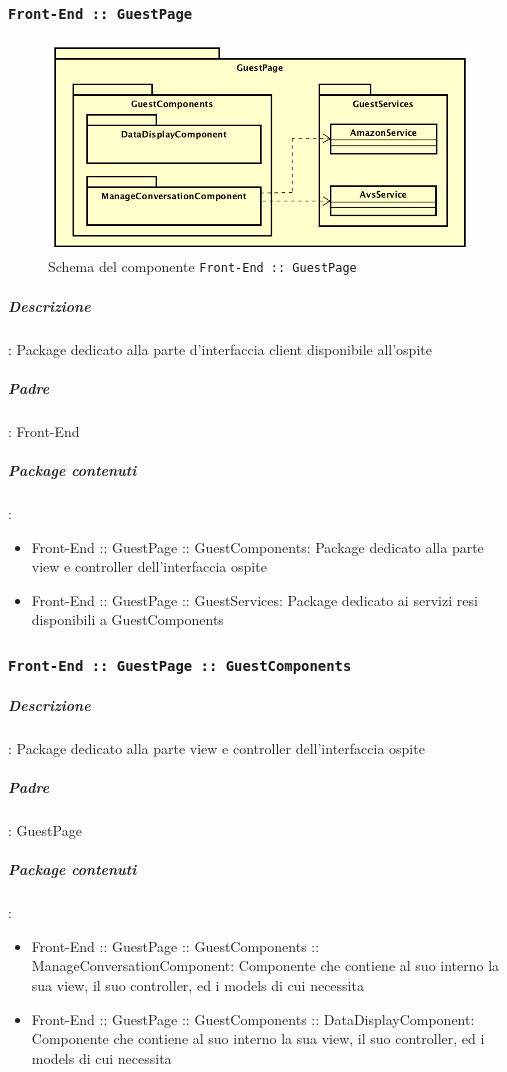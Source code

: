 \documentclass[../DefinizioneDiProdotto_v2.0.0.tex]{subfiles}
\begin{document}
	\newpage
	\subsubsection{\texttt{Front-End :: GuestPage}}
	\begin{figure}[!h]
		\centering
		\includegraphics[scale=0.6]{Architettura/Front-End/GuestPage/GuestPage.png}
		\caption{Schema del componente \texttt{Front-End :: GuestPage}}
	\end{figure}

			\subparagraph{Descrizione}: Package dedicato alla parte d'interfaccia client disponibile all'ospite
			\subparagraph{Padre}: Front-End
			\subparagraph{Package contenuti}:
			\begin{itemize}
				\item Front-End :: GuestPage :: GuestComponents: Package dedicato alla parte view e controller dell'interfaccia ospite
				\item Front-End :: GuestPage :: GuestServices: Package dedicato ai servizi resi disponibili a GuestComponents
			\end{itemize}


	\newpage
	\subsubsection{\texttt{Front-End :: GuestPage :: GuestComponents}}

			\subparagraph{Descrizione}: Package dedicato alla parte view e controller dell'interfaccia ospite
			\subparagraph{Padre}: GuestPage
			\subparagraph{Package contenuti}:
			\begin{itemize}
				\item Front-End :: GuestPage :: GuestComponents :: ManageConversationComponent: Componente che contiene al suo interno la sua view, il suo controller, ed i models di cui necessita
				\item Front-End :: GuestPage :: GuestComponents :: DataDisplayComponent: Componente che contiene al suo interno la sua view, il suo controller, ed i models di cui necessita
			\end{itemize}
\end{document}
